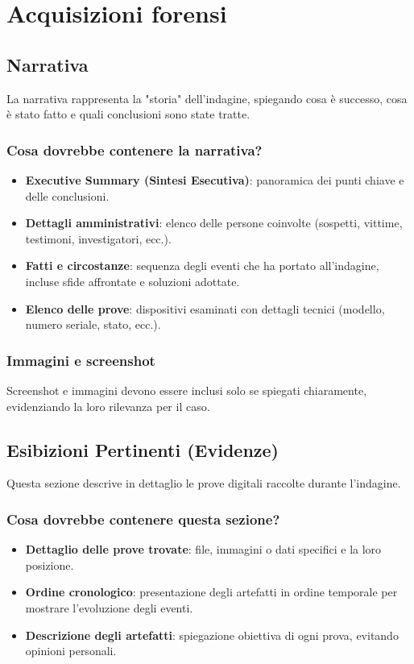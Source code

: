 \documentclass[a4paper,12pt]{report}
\begin{document}
\pagebreak

\chapter{Acquisizioni forensi}


\pagebreak

\section{Narrativa}
La narrativa rappresenta la "storia" dell'indagine, spiegando cosa è successo, cosa è stato fatto e quali conclusioni sono state tratte.

\subsection{Cosa dovrebbe contenere la narrativa?}
\begin{itemize}
    \item \textbf{Executive Summary (Sintesi Esecutiva)}: panoramica dei punti chiave e delle conclusioni.
    \item \textbf{Dettagli amministrativi}: elenco delle persone coinvolte (sospetti, vittime, testimoni, investigatori, ecc.).
    \item \textbf{Fatti e circostanze}: sequenza degli eventi che ha portato all'indagine, incluse sfide affrontate e soluzioni adottate.
    \item \textbf{Elenco delle prove}: dispositivi esaminati con dettagli tecnici (modello, numero seriale, stato, ecc.).
\end{itemize}

\subsection{Immagini e screenshot}
Screenshot e immagini devono essere inclusi solo se spiegati chiaramente, evidenziando la loro rilevanza per il caso.

\section{Esibizioni Pertinenti (Evidenze)}
Questa sezione descrive in dettaglio le prove digitali raccolte durante l'indagine.

\subsection{Cosa dovrebbe contenere questa sezione?}
\begin{itemize}
    \item \textbf{Dettaglio delle prove trovate}: file, immagini o dati specifici e la loro posizione.
    \item \textbf{Ordine cronologico}: presentazione degli artefatti in ordine temporale per mostrare l'evoluzione degli eventi.
    \item \textbf{Descrizione degli artefatti}: spiegazione obiettiva di ogni prova, evitando opinioni personali.
\end{itemize}
\end{document}
